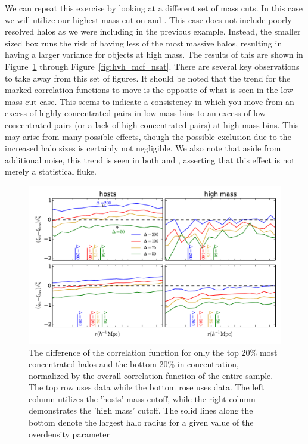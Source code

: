 \documentclass[usenatbib,usegraphicx,letterpaper]{mn2e}
\begin{document}
We can repeat this exercise by looking at a different set of mass cuts. In this case we will utilize our highest mass cut on \simB and \simC. This case does not include poorly resolved halos as we were including in the previous example. Instead, the smaller sized box runs the risk of having less of the most massive halos, resulting in having a larger variance for objects at high mass. The results of this are shown in Figure~\ref{fig:hvh_cfcompare} through Figure~\ref{fig:hvh_mcf_nsat}. There are several key observations to take away from this set of figures. It should be noted that the trend for the marked correlation functions to move is the opposite of what is seen in the low mass cut case. This seems to indicate a consistency in which you move from an excess of highly concentrated pairs in low mass bins to an excess of low concentrated pairs (or a lack of high concentrated pairs) at high mass bins. This may arise from many possible effects, though the possible exclusion due to the increased halo sizes is certainly not negligible. We also note that aside from additional noise, this trend is seen in both \simB and \simC, asserting that this effect is not merely a statistical fluke.

\begin{figure}
	\centering
	\includegraphics[width=\textwidth]{all_cfhilow_z00_hostsvhigh.pdf}
	\caption{The difference of the correlation function for only the top 20\% most concentrated halos and the bottom 20\% in concentration, normalized by the overall correlation function of the entire sample. The top row uses \simA data while the bottom rose uses \simB data. The left column utilizes the 'hosts' mass cutoff, while the right column demonstrates the 'high mass' cutoff. The solid lines along the bottom denote the largest halo radius for a given value of the overdensity parameter}
	\label{fig:hvh_cfcompare}
\end{figure}
\end{document}
